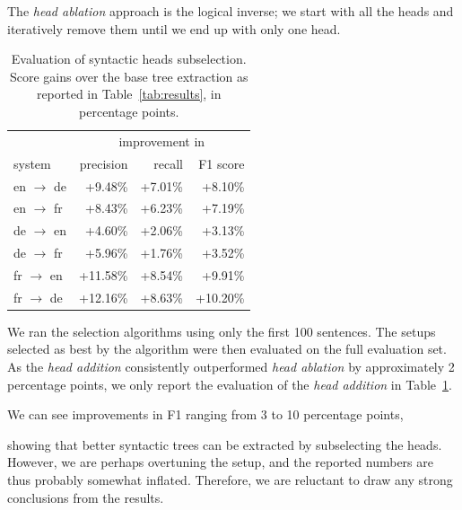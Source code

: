 \documentclass[11pt,a4paper]{article}
\def\DEL#1{{\color{green}SMAZAT: \it #1}}
\def\DEL#1{}
\begin{document}
The \emph{head ablation} approach is the logical inverse; we start with all the heads and iteratively remove them until we end up with only one head. 

\DEL{the standard variant of our parsing algorithm, using all of the attention heads to extract phrase scores.
We then try to remove each head, construct the parse trees, and evaluate them against the standard parse trees.
From the evaluated setups, we select the one which achieved the highest score, and iterate, until we end up with only one head.
In each step, we remove the head whose removal leads to the highest increase or lowest decrease of the crossing brackets precision of the resulting tree.
%
The \emph{head addition} approach is the logical inverse of the head ablation approach: we start with no heads, and 
}

\begin{table}[t]
\centering
\begin{tabular}{l|rrr}
& \multicolumn{3}{c}{improvement in} \\
system & precision & recall & F1 score \\
\hline
en $\rightarrow$ de & +9.48\% & +7.01\% & +8.10\% \\
en $\rightarrow$ fr & +8.43\% & +6.23\% & +7.19\% \\
\hline
de $\rightarrow$ en & +4.60\% & +2.06\% & +3.13\% \\
de $\rightarrow$ fr & +5.96\% & +1.76\% & +3.52\% \\
\hline
fr $\rightarrow$ en & +11.58\% & +8.54\% & +9.91\% \\
fr $\rightarrow$ de & +12.16\% & +8.63\% & +10.20\% \\
\end{tabular}
\caption{Evaluation of syntactic heads subselection. Score gains over the base tree extraction as reported in Table~\ref{tab:results}, in percentage points.}
\label{tab:addhead}
\end{table}

We ran the selection algorithms using only the first 100 sentences.
The setups selected as best by the algorithm were then evaluated on the full evaluation set.
As the \emph{head addition} consistently outperformed \emph{head ablation} by approximately 2 percentage points, we only report the evaluation of the \emph{head addition} in Table~\ref{tab:addhead}.

We can see improvements in F1 ranging from 3 to 10 percentage points,
\DEL{Moreover, the improvements on the 100 development sentences (not shown here) are higher by several percentage points than on the full set.}
showing
that better syntactic trees can be extracted by subselecting the heads.
However, we are perhaps overtuning the setup, and the reported numbers are thus probably somewhat inflated.
Therefore, we are reluctant to draw any strong conclusions from the results.
\end{document}
